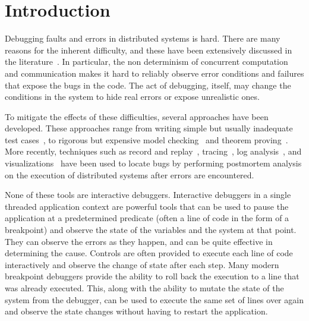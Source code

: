 \section{Introduction}
\label{sec:intro}

Debugging faults and errors in distributed systems is hard. There are many reasons for the inherent difficulty, and these have been extensively discussed in the literature~\cite{testing1,shiviz,valadares2016}. In particular, the non determinism of concurrent computation and communication makes it hard to reliably observe error conditions and failures that expose the bugs in the code. The act of debugging, itself, may change the conditions in the system to hide real errors or expose unrealistic ones.

To mitigate the effects of these difficulties, several approaches have been developed. These approaches range from writing simple but usually inadequate test cases~\cite{testing2}, to rigorous but expensive model checking~\cite{modelchecking1} and theorem proving~\cite{verdi}. More recently, techniques such as record and replay~\cite{recordreplay}, tracing~\cite{tracing}, log analysis~\cite{loganalysis}, and visualizations~\cite{shiviz} have been used to locate bugs by performing postmortem analysis on the execution of distributed systems after errors are encountered.

None of these tools are interactive debuggers. Interactive debuggers in a single threaded application context are powerful tools that can be used to pause the application at a predetermined predicate (often a line of code in the form of a breakpoint) and observe the state of the variables and the system at that point. They can observe the errors as they happen, and can be quite effective in determining the cause. Controls are often provided to execute each line of code interactively and observe the change of state after each step. Many modern breakpoint debuggers provide the ability to roll back the execution to a line that was already executed. This, along with the ability to mutate the state of the system from the debugger, can be used to execute the same set of lines over again and observe the state changes without having to restart the application.


